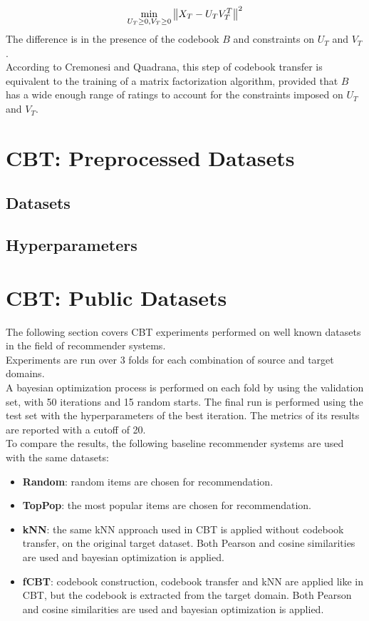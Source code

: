 \begin{equation*}
\min_{U_T \geq 0, V_T \geq 0} \left\lVert X_T - U_T V_T^T\right\rVert^2
\end{equation*}
The difference is in the presence of the codebook $B$ and constraints on $U_T$ and $V_T$.\\
According to Cremonesi and Quadrana, this step of codebook transfer is equivalent to the training of a matrix factorization algorithm, provided that $B$ has a wide enough range of ratings to account for the constraints imposed on $U_T$ and $V_T$.



\section{CBT: Preprocessed Datasets}


\subsection{Datasets}


\subsection{Hyperparameters}



\section{CBT: Public Datasets}

The following section covers CBT experiments performed on well known datasets in the field of recommender systems.\\
Experiments are run over 3 folds for each combination of source and target domains.\\
A bayesian optimization process is performed on each fold by using the validation set, with 50 iterations and 15 random starts. The final run is performed using the test set with the hyperparameters of the best iteration. The metrics of its results are reported with a cutoff of 20.\\
To compare the results, the following baseline recommender systems are used with the same datasets:
\begin{itemize}
\item \textbf{Random}: random items are chosen for recommendation.
\item \textbf{TopPop}: the most popular items are chosen for recommendation.
\item \textbf{kNN}: the same kNN approach used in CBT is applied without codebook transfer, on the original target dataset. Both Pearson and cosine similarities are used and bayesian optimization is applied.
\item \textbf{fCBT}: codebook construction, codebook transfer and kNN are applied like in CBT, but the codebook is extracted from the target domain. Both Pearson and cosine similarities are used and bayesian optimization is applied.
\end{itemize}


